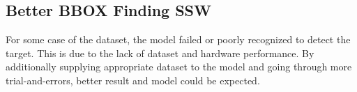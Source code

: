 \documentclass{article}
\begin{document}
\subsection{Better BBOX Finding SSW}
For some case of the dataset, the model failed or poorly recognized to detect
the target. This is due to the lack of dataset and hardware performance. By
additionally supplying appropriate dataset to the model and going through more
trial-and-errors, better result and model could be expected.



\end{document}
